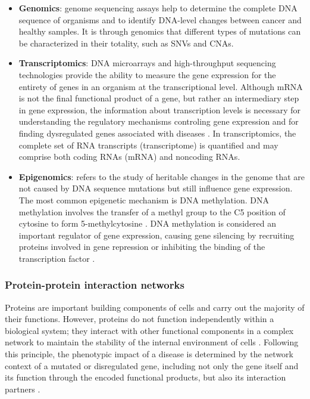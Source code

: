 \begin{itemize}
    \item \textbf{Genomics}: genome sequencing assays help to determine the complete DNA sequence of organisms and to identify DNA-level changes between cancer and healthy samples. It is through genomics that different types of mutations can be characterized in their totality, such as SNVs and CNAs.
    \item \textbf{Transcriptomics}: DNA microarrays and high-throughput sequencing technologies provide the ability to measure the gene expression for the entirety of genes in an organism at the transcriptional level. Although mRNA is not the final functional product of a gene, but rather an intermediary step in gene expression, the information about transcription levels is necessary for understanding the regulatory mechanisms controling gene expression and for finding dysregulated genes associated with diseases \cite{brazma2000gene}. In transcriptomics, the complete set of RNA transcripts (\ie transcriptome) is quantified and may comprise both coding RNAs (\ie mRNA) and noncoding RNAs.
    \item \textbf{Epigenomics}: refers to the study of heritable changes in the genome that are not caused by DNA sequence mutations but still influence gene expression. The most common epigenetic mechanism is DNA methylation. DNA methylation involves the transfer of a methyl group to the C5 position of cytosine to form 5-methylcytosine \cite{moore2013dna}. DNA methylation is considered an important regulator of gene expression, causing gene silencing by recruiting proteins involved in gene repression or inhibiting the binding of the transcription factor \cite{kulis2010dna}. 
\end{itemize}


\subsubsection{Protein-protein interaction networks}
\label{sec:background_ppi}

Proteins are important building components of cells and carry out the majority of their functions. However, proteins do not function independently within a biological system; they interact with other functional components in a complex network to maintain the stability of the internal environment of cells \cite{koh2012analyzing}. Following this principle, the phenotypic impact of a disease is determined by the network context of a mutated or disregulated gene, including not only the gene itself and its function through the encoded functional products, but also its interaction partners \cite{barabasi2011network}.


